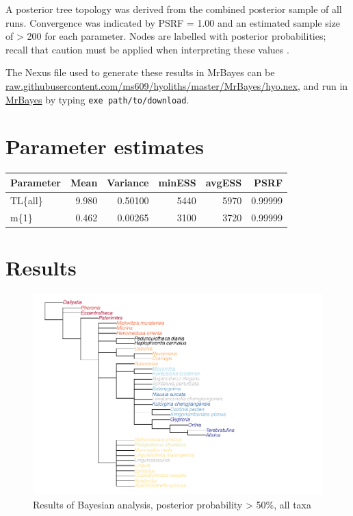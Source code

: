 \documentclass[openany]{book}
\begin{document}
A posterior tree topology was derived from the combined posterior sample
of all runs. Convergence was indicated by PSRF = 1.00 and an estimated
sample size of \textgreater{} 200 for each parameter. Nodes are labelled
with posterior probabilities; recall that caution must be applied when
interpreting these values \citep{Yang2018}.

The Nexus file used to generate these results in MrBayes can be
\href{https://raw.githubusercontent.com/ms609/hyoliths/master/MrBayes/hyo.nex}{raw.githubusercontent.com/ms609/hyoliths/master/MrBayes/hyo.nex},
and run in \href{http://mrbayes.sourceforge.net/download.php}{MrBayes}
by typing \texttt{exe\ path/to/download}.

\section{Parameter estimates}\label{parameter-estimates}

\begin{tabular}{l|r|r|r|r|r}
\hline
Parameter & Mean & Variance & minESS & avgESS & PSRF\\
\hline
TL\{all\} & 9.980 & 0.50100 & 5440 & 5970 & 0.99999\\
\hline
m\{1\} & 0.462 & 0.00265 & 3100 & 3720 & 0.99999\\
\hline
\end{tabular}

\section{Results}\label{results-1}

\begin{figure}
\centering
\includegraphics{Brachiopod_phylogeny_files/figure-latex/mrbayes-full-consensus-1.pdf}
\caption{\label{fig:mrbayes-full-consensus}Results of Bayesian analysis,
posterior probability \textgreater{} 50\%, all taxa}
\end{figure}
\end{document}
